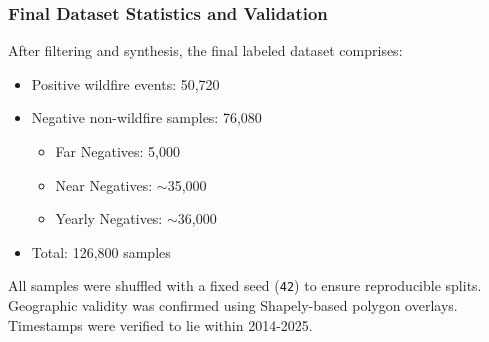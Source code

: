 \documentclass[conference]{IEEEtran}
\begin{document}

\subsubsection{Final Dataset Statistics and Validation}

After filtering and synthesis, the final labeled dataset comprises:

\begin{itemize}
    \item Positive wildfire events: 50,720
    \item Negative non-wildfire samples: 76,080
    \begin{itemize}
        \item Far Negatives: 5,000
        \item Near Negatives: \(\sim\)35,000
        \item Yearly Negatives: \(\sim\)36,000
    \end{itemize}
    \item Total: 126,800 samples
\end{itemize}

All samples were shuffled with a fixed seed (\texttt{42}) to ensure reproducible splits. Geographic validity was confirmed using Shapely-based polygon overlays. Timestamps were verified to lie within 2014-2025.



\end{document}

